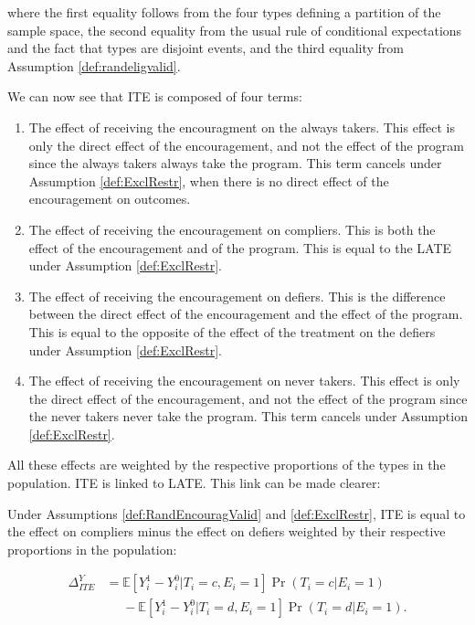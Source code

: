 \documentclass[]{book}
\providecommand{\tightlist}{%
  \setlength{\itemsep}{0pt}\setlength{\parskip}{0pt}}
\newcommand{\esp}[1]{\mathbb{E}[ #1 ]}
\theoremstyle{definition}
\theoremstyle{definition}
\theoremstyle{definition}
\theoremstyle{remark}
\let\BeginKnitrBlock\begin \let\EndKnitrBlock\end
\begin{document}
where the first equality follows from the four types defining a partition of the sample space, the second equality from the usual rule of conditional expectations and the fact that types are disjoint events, and the third equality from Assumption \ref{def:randeligvalid}.

We can now see that ITE is composed of four terms:

\begin{enumerate}
\def\labelenumi{\arabic{enumi}.}
\tightlist
\item
  The effect of receiving the encouragment on the always takers.
  This effect is only the direct effect of the encouragement, and not the effect of the program since the always takers always take the program.
  This term cancels under Assumption \ref{def:ExclRestr}, when there is no direct effect of the encouragement on outcomes.
\item
  The effect of receiving the encouragement on compliers.
  This is both the effect of the encouragement and of the program.
  This is equal to the LATE under Assumption \ref{def:ExclRestr}.
\item
  The effect of receiving the encouragement on defiers.
  This is the difference between the direct effect of the encouragement and the effect of the program.
  This is equal to the opposite of the effect of the treatment on the defiers under Assumption \ref{def:ExclRestr}.
\item
  The effect of receiving the encouragement on never takers.
  This effect is only the direct effect of the encouragement, and not the effect of the program since the never takers never take the program.
  This term cancels under Assumption \ref{def:ExclRestr}.
\end{enumerate}

All these effects are weighted by the respective proportions of the types in the population.
ITE is linked to LATE.
This link can be made clearer:

\BeginKnitrBlock{theorem}[From ITE to Compliers and Defiers]
\protect\hypertarget{thm:ITELATE}{}{\label{thm:ITELATE} \iffalse (From ITE to Compliers and Defiers) \fi{} }Under Assumptions \ref{def:RandEncouragValid} and \ref{def:ExclRestr}, ITE is equal to the effect on compliers minus the effect on defiers weighted by their respective proportions in the population:

\begin{align*}
  \Delta^Y_{ITE} & = \esp{Y_i^{1}-Y_i^{0}|T_i=c,E_i=1}\Pr(T_i=c|E_i=1)\\
                  & \phantom{=}-\esp{Y_i^{1}-Y_i^{0}|T_i=d,E_i=1}\Pr(T_i=d|E_i=1).
\end{align*}
\EndKnitrBlock{theorem}
\end{document}
